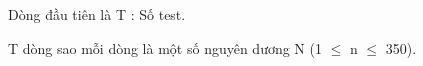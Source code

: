Dòng đầu tiên là T : Số test.  

   T dòng sao mỗi dòng là một số nguyên dương N (1 $\le$ n  $\le$ 350).